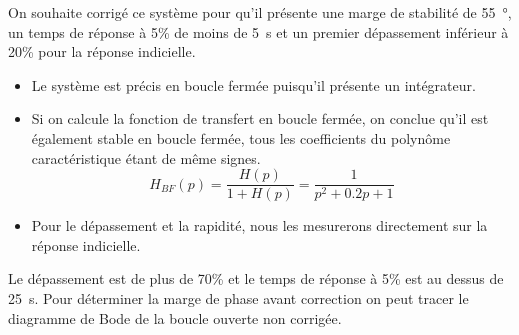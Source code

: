 On souhaite corrigé ce système pour qu'il présente une marge de stabilité de
\SI{55}{\degree}, un temps de réponse à 5\% de moins de \SI{5}{\second} et 
un premier dépassement inférieur à 20\% pour la réponse indicielle.
\begin{itemize}
    \item Le système est précis en boucle fermée puisqu'il présente 
          un intégrateur.
    \item Si on calcule la fonction de transfert en boucle fermée, on conclue 
          qu'il est également stable en boucle fermée, tous les coefficients
          du polynôme caractéristique étant de même signes.
          \[
            H_{BF}(p)=\dfrac{H(p)}{1+H(p)}=\dfrac{1}{p^2+0.2p+1}
          \]
    \item Pour le dépassement et la rapidité, nous les mesurerons 
          directement sur la réponse indicielle.
\end{itemize}
\begin{center}
    
\end{center}
Le dépassement est de plus de 70\% et le temps de réponse à 5\% est au dessus 
de \SI{25}{\second}.
Pour déterminer la marge de phase avant correction on peut tracer le diagramme
de Bode de la boucle ouverte non corrigée.
\begin{center}
    
\end{center}
